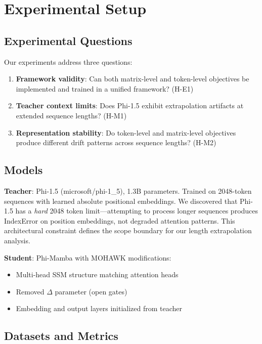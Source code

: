 \section{Experimental Setup}
\label{sec:experiments}

\subsection{Experimental Questions}

Our experiments address three questions:

\begin{enumerate}
    \item \textbf{Framework validity}: Can both matrix-level and token-level objectives be implemented and trained in a unified framework? (H-E1)
    \item \textbf{Teacher context limits}: Does Phi-1.5 exhibit extrapolation artifacts at extended sequence lengths? (H-M1)
    \item \textbf{Representation stability}: Do token-level and matrix-level objectives produce different drift patterns across sequence lengths? (H-M2)
\end{enumerate}

\subsection{Models}

\textbf{Teacher}: Phi-1.5 (microsoft/phi-1\_5), 1.3B parameters. Trained on 2048-token sequences with learned absolute positional embeddings. We discovered that Phi-1.5 has a \emph{hard} 2048 token limit---attempting to process longer sequences produces IndexError on position embeddings, not degraded attention patterns. This architectural constraint defines the scope boundary for our length extrapolation analysis.

\textbf{Student}: Phi-Mamba with MOHAWK modifications:
\begin{itemize}
    \item Multi-head SSM structure matching attention heads
    \item Removed $\Delta$ parameter (open gates)
    \item Embedding and output layers initialized from teacher
\end{itemize}

\subsection{Datasets and Metrics}

